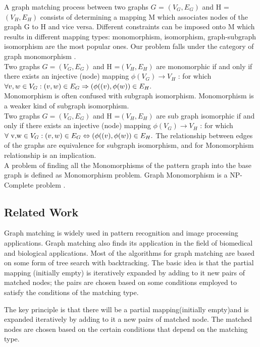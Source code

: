 A graph matching process between two graphs $G$ = $(V_G,E_G)$ and H = $(V_H,E_H)$ consists of determining a mapping M which associates nodes of the graph G to H and vice versa. Different constraints can be imposed onto M which results in different mapping types: monomorphism, isomorphism, graph-subgraph isomorphism are the most popular ones. Our problem falls under the category of graph monomorphism . \\
Two graphs 
 $G =( V_G, E_G)$ and
 H =$( V_H, E_H)$  are monomorphic  if and only if there exists an injective (node)
mapping $\phi (V_G) \rightarrow  V_H$ : for which $\forall v,w \in V_G:(v,w) \in E_G \Rightarrow (\phi((v),\space \phi(w)) \in E_H.$\\  

Monomorphism is often confused with subgraph isomorphism. Monomorphism is a weaker kind of subgraph isomorphism. \\
Two graphs  $G =( V_G, E_G)$ and
 H =$( V_H, E_H)$  are sub graph isomorphic  if and only if there exists an injective (node)
mapping $\phi( V_G) \rightarrow  V_H$ : for which $\forall \text{ v,w} \in V_G:(v,w) \in E_G \Leftrightarrow (\phi((v),\space \phi(w)) \in E_H.$ 
The relationship between edges of the graphs are equivalence for subgraph isomorphism, and for Monomorphism  relationship  is an implication.\\
A problem of finding all the Monomorphisms of the pattern graph into the base graph is defined as Monomorphism problem. Graph Monomorphism is a NP-Complete problem \cite{Garey:1979:CIG:578533}. 
\subsection{Related Work}

Graph matching is widely used in pattern recognition and image processing applications. Graph matching also finds its application in the field of biomedical and biological applications. 
Most of the algorithms for graph matching are based on some form of tree search with backtracking.
 The basic idea is that the partial mapping (initially empty) is iteratively expanded by adding to it new pairs of matched nodes; the pairs are chosen based on some conditions employed to satisfy the conditions of the matching type.

The key principle is that there will be a partial mapping(initially empty)and is expanded iteratively by adding to it a new pairs of matched node. The matched nodes are chosen based on the certain conditions that depend on the matching type.

